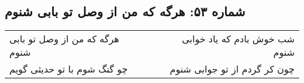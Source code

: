 \begin{center}
\section*{شماره ۵۳: هرگه که من از وصل تو بابی شنوم}
\label{sec:053}
\begin{longtable}{l p{0.5cm} r}
هرگه که من از وصل تو بابی شنوم
&&
شب خوش بادم که یاد خوابی شنوم
\\
چو گنگ شوم با تو حدیثی گویم
&&
چون کر گردم از تو جوابی شنوم
\\
\end{longtable}
\end{center}

